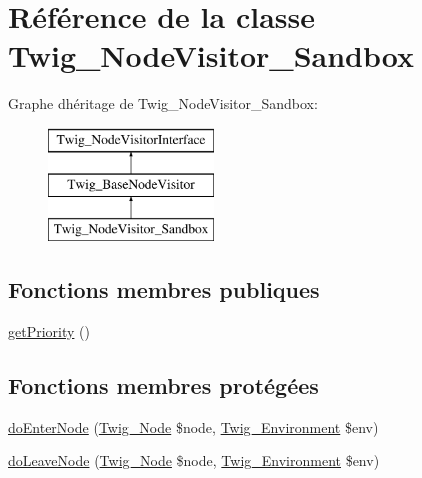 \hypertarget{class_twig___node_visitor___sandbox}{}\section{Référence de la classe Twig\+\_\+\+Node\+Visitor\+\_\+\+Sandbox}
\label{class_twig___node_visitor___sandbox}
Graphe d\textquotesingle{}héritage de Twig\+\_\+\+Node\+Visitor\+\_\+\+Sandbox\+:\begin{figure}[H]
\begin{center}
\leavevmode
\includegraphics[height=3.000000cm]{class_twig___node_visitor___sandbox}
\end{center}
\end{figure}
\subsection*{Fonctions membres publiques}
\begin{DoxyCompactItemize}
\item 
\hyperlink{class_twig___node_visitor___sandbox_a1e7a3c168dcd0901a0d2669c67575b55}{get\+Priority} ()
\end{DoxyCompactItemize}
\subsection*{Fonctions membres protégées}
\begin{DoxyCompactItemize}
\item 
\hyperlink{class_twig___node_visitor___sandbox_a58d59325d3add0c1004f6a5cfb2562af}{do\+Enter\+Node} (\hyperlink{class_twig___node}{Twig\+\_\+\+Node} \$node, \hyperlink{class_twig___environment}{Twig\+\_\+\+Environment} \$env)
\item 
\hyperlink{class_twig___node_visitor___sandbox_a7e9db0312cbd70344096235921930dd2}{do\+Leave\+Node} (\hyperlink{class_twig___node}{Twig\+\_\+\+Node} \$node, \hyperlink{class_twig___environment}{Twig\+\_\+\+Environment} \$env)
\end{DoxyCompactItemize}
